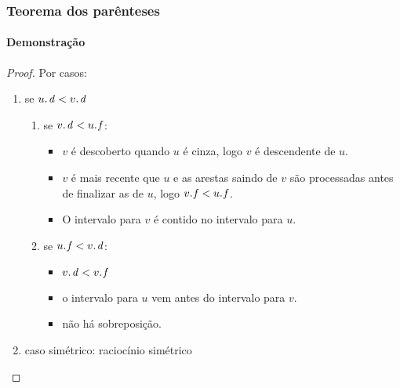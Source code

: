 \documentclass{beamer}
\begin{document}
\begin{frame}
\frametitle{Teorema dos parênteses}
\framesubtitle{Demonstração}

\begin{proof}
Por casos:
\begin{enumerate}
\item se $\attrib{u}{d} < \attrib{v}{d}$
\begin{enumerate}
\item se $\attrib{v}{d} < \attrib{u}{f}$: 
\begin{itemize}
\item $v$ é descoberto quando $u$ é cinza, logo $v$ é descendente de $u$.
\item $v$ é mais recente que $u$ e as arestas saindo de $v$ são processadas 
  antes de finalizar as de $u$, logo $\attrib{v}{f} < \attrib{u}{f}$. 
\item O intervalo para $v$ é contido no intervalo para $u$.
\end{itemize}
\item se $\attrib{u}{f} < \attrib{v}{d}$: 
\begin{itemize}
\item $\attrib{v}{d} < \attrib{v}{f}$
\item o intervalo para $u$ vem antes do intervalo para $v$. 
\item não há sobreposição.
\end{itemize}
\end{enumerate}
\item caso simétrico: raciocínio simétrico
\end{enumerate}
\end{proof}

\end{frame}
\end{document}
